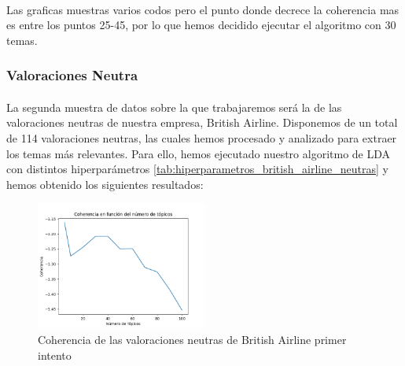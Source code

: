 \documentclass{report}
\begin{document}
                    \paragraph*{}{
                        Las graficas muestras varios codos pero el punto donde decrece la coherencia mas es entre los puntos 25-45, por lo que hemos decidido ejecutar el algoritmo con 30 temas.
                    }
                \clearpage\subsubsection*{Valoraciones Neutra}
                    \paragraph*{}{
                        La segunda muestra de datos sobre la que trabajaremos será la de las valoraciones neutras de nuestra empresa, British Airline.
                        Disponemos de un total de 114 valoraciones neutras, las cuales hemos procesado y analizado para extraer los temas más relevantes.
                        Para ello, hemos ejecutado nuestro algoritmo de LDA con distintos hiperparámetros \ref{tab:hiperparametros_british_airline_neutras} y hemos obtenido los siguientes resultados:
                    }
                    \begin{figure}[H]
                        \centering
                        \includegraphics[width=0.5\textwidth]{./img/british_airline_neutras1.png}
                        \caption{Coherencia de las valoraciones neutras de British Airline primer intento}
                    \end{figure}
\end{document}
